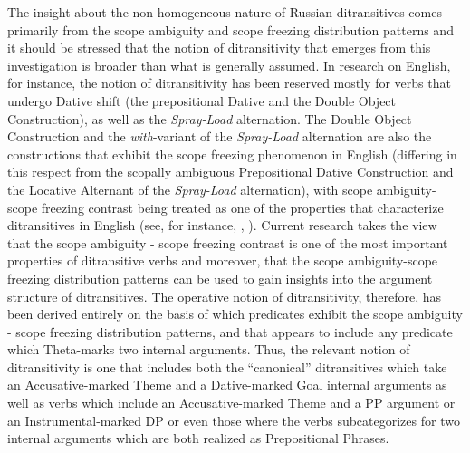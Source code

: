 \documentclass[output=paper,colorlinks,citecolor=brown,modfonts,nonflat]{langsci/langscibook}
\begin{document}
The insight about the non-homogeneous nature of Russian ditransitives comes primarily from the scope ambiguity and scope freezing distribution patterns and it should be stressed that the notion of ditransitivity that emerges from this investigation is broader than what is generally assumed. In research on English, for instance, the notion of ditransitivity has been reserved mostly for verbs that undergo Dative shift (the prepositional Dative and the Double Object Construction), as well as the \textit{Spray-Load} alternation. The Double Object Construction and the \textit{with}{}-variant of the \textit{Spray-Load} alternation are also the constructions that exhibit the scope freezing phenomenon in English (differing in this respect from the scopally ambiguous Prepositional Dative Construction and the Locative Alternant of the \textit{Spray-Load} alternation), with scope ambiguity-scope freezing contrast being treated as one of the properties that characterize ditransitives in English (see, for instance, \citealt{Bruening2001}, \citeyear{Bruening2010DOC}). Current research takes the view that the scope ambiguity - scope freezing contrast is one of the most important properties of ditransitive verbs and moreover, that the scope ambiguity-scope freezing distribution patterns can be used to gain insights into the argument structure of ditransitives. The operative notion of ditransitivity, therefore, has been derived entirely on the basis of which predicates exhibit the scope ambiguity - scope freezing distribution patterns, and that appears to include any predicate which Theta-marks two internal arguments. Thus, the relevant notion of ditransitivity is one that includes both the “canonical” ditransitives which take an Accusative-marked Theme and a Dative-marked Goal internal arguments as well as verbs which include an Accusative-marked Theme and a PP argument or an Instrumental-marked DP or even those where the verbs subcategorizes for two internal arguments which are both realized as Prepositional Phrases.
\end{document}
